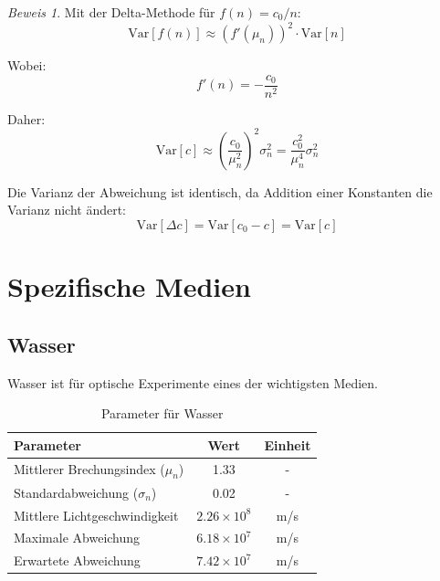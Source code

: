 \documentclass[12pt,a4paper,oneside]{article}
\theoremstyle{definition}
\theoremstyle{remark}
\newtheorem*{beweis}{Beweis}
\newcommand{\cLight}{c}
\newcommand{\deviation}{\Delta}
\begin{document}
\begin{beweis}
Mit der Delta-Methode für $f(n) = \cLight_0/n$:
\begin{equation}
    \text{Var}[f(n)] \approx (f'(\mu_n))^2 \cdot \text{Var}[n]
\end{equation}

Wobei:
\begin{equation}
    f'(n) = -\frac{\cLight_0}{n^2}
\end{equation}

Daher:
\begin{equation}
    \text{Var}[\cLight] \approx \left(\frac{\cLight_0}{\mu_n^2}\right)^2 \sigma_n^2 = \frac{\cLight_0^2}{\mu_n^4} \sigma_n^2
\end{equation}

Die Varianz der Abweichung ist identisch, da Addition einer Konstanten die Varianz nicht ändert:
\begin{equation}
    \text{Var}[\deviation \cLight] = \text{Var}[\cLight_0 - \cLight] = \text{Var}[\cLight]
\end{equation}
\end{beweis}

\section{Spezifische Medien}

\subsection{Wasser}

Wasser ist für optische Experimente eines der wichtigsten Medien.

\begin{table}[h]
\centering
\begin{tabular}{|l|c|c|}
\toprule
\textbf{Parameter} & \textbf{Wert} & \textbf{Einheit} \\
\midrule
Mittlerer Brechungsindex ($\mu_n$) & 1.33 & - \\
Standardabweichung ($\sigma_n$) & 0.02 & - \\
Mittlere Lichtgeschwindigkeit & $2.26 \times 10^8$ & m/s \\
Maximale Abweichung & $6.18 \times 10^7$ & m/s \\
Erwartete Abweichung & $7.42 \times 10^7$ & m/s \\
\bottomrule
\end{tabular}
\caption{Parameter für Wasser}
\end{table}
\end{document}
